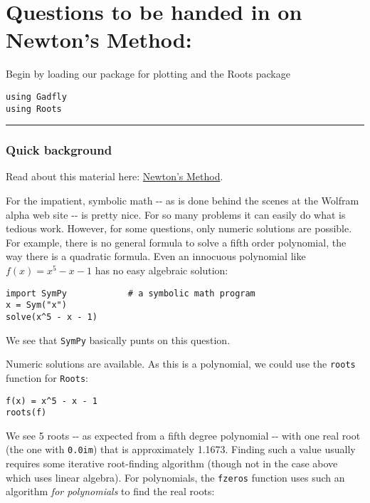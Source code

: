 \documentclass[12pt]{article}
\begin{document}
\section{Questions to be handed in on Newton's Method:}

Begin by loading our package for plotting and the Roots package



\begin{verbatim}
using Gadfly            
using Roots
\end{verbatim}
\begin{center}\rule{3in}{0.4pt}\end{center}

\subsubsection{Quick background}

Read about this material here:
\href{http://mth229.github.io/newton.html}{Newton's Method}.

For the impatient, symbolic math -{}- as is done behind the scenes at
the Wolfram alpha web site -{}- is pretty nice. For so many problems it
can easily do what is tedious work. However, for some questions, only
numeric solutions are possible. For example, there is no general formula
to solve a fifth order polynomial, the way there is a quadratic formula.
Even an innocuous polynomial like $f(x) = x^5 - x - 1$ has no easy
algebraic solution:



\begin{verbatim}
import SymPy            # a symbolic math program
x = Sym("x")
solve(x^5 - x - 1)
\end{verbatim}
We see that \texttt{SymPy} basically punts on this question.

Numeric solutions are available. As this is a polynomial, we could use
the \texttt{roots} function for \texttt{Roots}:



\begin{verbatim}
f(x) = x^5 - x - 1
roots(f)
\end{verbatim}
We see 5 roots -{}- as expected from a fifth degree polynomial -{}- with
one real root (the one with \texttt{0.0im}) that is approximately
1.1673. Finding such a value usually requires some iterative
root-finding algorithm (though not in the case above which uses linear
algebra). For polynomials, the \texttt{fzeros} function uses such an
algorithm \emph{for polynomials} to find the real roots:
\end{document}
